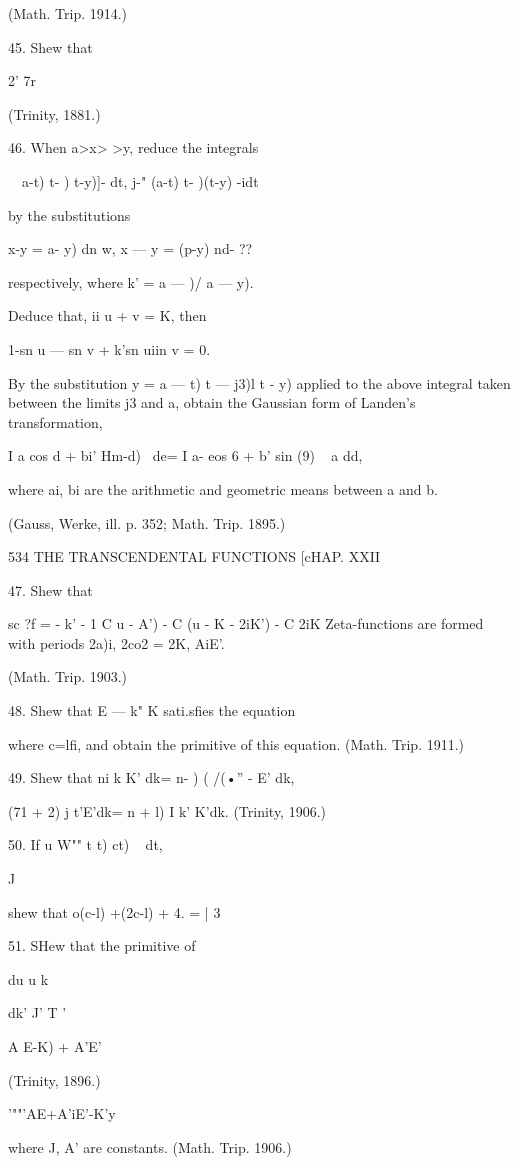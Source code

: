 (Math. Trip. 1914.)

45. Shew that

2' 7r

(Trinity, 1881.)

46. When a>x> >y, reduce the integrals

\ \ a-t) t- ) t-y)]- dt, j-" (a-t) t- )(t-y) -idt

by the substitutions

x-y = a- y) dn w, x — y = (p-y) nd- ??

respectively, where k' = a — )/ a — y).

Deduce that, ii u + v = K, then

1-sn u — sn v + k'sn uiin v = 0.

By the substitution y = a — t) t — j3)l t - y) applied to the above
integral taken between the limits j3 and a, obtain the Gaussian form
of Landen's transformation,

I a cos d + bi' Hm-d)~ de= I a- eos 6 + b' sin (9) ~ a dd,

where ai, bi are the arithmetic and geometric means between a and b.

(Gauss, Werke, ill. p. 352; Math. Trip. 1895.)

534 THE TRANSCENDENTAL FUNCTIONS [cHAP. XXII

47. Shew that

sc ?f = - k' - 1 C u - A') - C (u - K - 2iK') - C 2iK%
Zeta-functions are formed with periods 2a)i, 2co2 = 2K, AiE'.

(Math. Trip. 1903.)

48. Shew that E — k" K sati.sfies the equation

where c=lfi, and obtain the primitive of this equation. (Math. Trip.
1911.)

49. Shew that ni k K' dk= n- ) ( /(•'' - E' dk,

(71 + 2) j t'E'dk= n + l) I k' K'dk. (Trinity, 1906.)

50. If u W"" t t) ct) ~ dt,

  J

shew that o(c-l) +(2c-l) + 4. = | 3

51. SHew that the primitive of

du u k \

dk' J' T '

A E-K) + A'E'

(Trinity, 1896.)

'""'AE+A'iE'-K'y

where J, A' are constants. (Math. Trip. 1906.)

